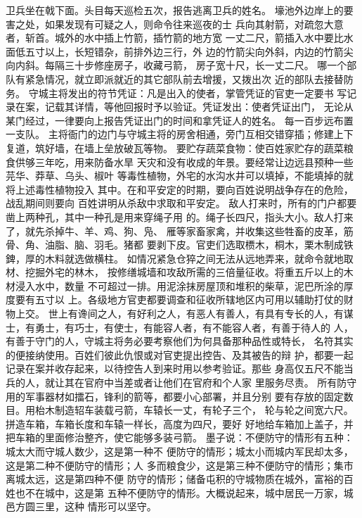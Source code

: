 \documentclass[12pt,UTF8]{ctexbook}
\begin{document}
卫兵坐在戟下面。头目每天巡检五次，报告逃离卫兵的姓名。 
壕池外边岸上的要害之处，如果发现有可疑之人，则命令往来巡夜的士 
兵向其射箭，对疏忽大意者，斩首。城外的水中插上竹箭，插竹箭的地方宽 
一丈二尺，箭插入水中要比水面低五寸以上，长短错杂，前排外边三行，外 
边的竹箭尖向外斜，内边的竹箭尖向内斜。每隔三十步修座房子，收藏弓箭， 
房子宽十尺，长一丈二尺。 
哪一个部队有紧急情况，就立即派就近的其它部队前去增援，又拨出次 
近的部队去接替防务。 
守城主将发出的符节凭证：凡是出入的使者，掌管凭证的官吏一定要书 
写记录在案，记载其详情，等他回报时予以验证。凭证发出：使者凭证出门， 
无论从某门经过，一律要向上报告凭证出门的时间和拿凭证人的姓名。 
每一百步远布置一支队。 
主将衙门的边门与守城主将的房舍相通，旁门互相交错穿插；修建上下 
复道，筑好墙，在墙上垒放破瓦等物。 
要贮存蔬菜食物：使百姓家贮存的蔬菜粮食供够三年吃，用来防备水旱 
天灾和没有收成的年景。要经常让边远县预种一些芫华、莽草、乌头、椒叶 
等毒性植物，外宅的水沟水井可以填掉，不能填掉的就将上述毒性植物投入 
其中。在和平安定的时期，要向百姓说明战争存在的危险，战乱期间则要向 
百姓讲明从杀敌中求取和平安定。 
敌人打来时，所有的门户都要凿上两种孔，其中一种孔是用来穿绳子用 
的。绳子长四尺，指头大小。敌人打来了，就先杀掉牛、羊、鸡、狗、凫、 
雁等家畜家禽，并收集这些牲畜的皮革，筋骨、角、油脂、脑、羽毛。猪都 
要剥下皮。官吏们选取槚木，桐木，栗木制成铁錍，厚的木料就选做横柱。 
如情况紧急仓猝之间无法从远地弄来，就命令就地取材、挖掘外宅的林木， 
按修缮城墙和攻敌所需的三倍量征收。将重五斤以上的木材浸入水中，数量 
不可超过一排。用泥涂抹房屋顶和堆积的柴草，泥巴所涂的厚度要有五寸以 
上。各级地方官吏都要调查和征收所辖地区内可用以辅助打仗的财物上交。 
世上有谗间之人，有好利之人，有恶人有善人，有具有专长的人，有谋 
士，有勇士，有巧士，有使士，有能容人者，有不能容人者，有善于待人的 
人，有善于守门的人，守城主将务必要考察他们为何具备那种品性或特长， 
名符其实的便接纳使用。百姓们彼此仇恨或对官吏提出控告、及其被告的辩 
护，都要一起记录在案并收存起来，以待控告人到来时用以参考验证。那些 
身高仅五尺不能当兵的人，就让其在官府中当差或者让他们在官府和个人家 
里服务尽责。 
所有防守用的军事器材如擂石，锋利的箭等，都要小心部署，并且分别 
要有存放的固定数目。用枱木制造轺车装载弓箭，车辕长一丈，有轮子三个， 
轮与轮之间宽六尺。拼造车箱，车箱长度和车辕一样长，高度为四尺，要好 
好地给车箱加上盖子，并把车箱的里面修治整齐，使它能够多装弓箭。 
墨子说：不便防守的情形有五种：城太大而守城人数少，这是第一种不 
便防守的情形；城太小而城内军民却太多，这是第二种不便防守的情形；人 
多而粮食少，这是第三种不便防守的情形；集市离城太远，这是第四种不便 
防守的情形；储备屯积的守城物质在城外，富裕的百姓也不在城中，这是第 
五种不便防守的情形。大概说起来，城中居民一万家，城邑方圆三里，这种 
情形可以坚守。 
\end{document}
